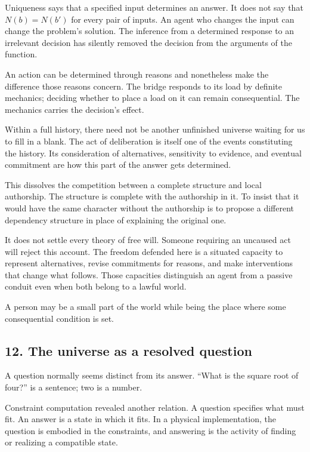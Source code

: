 \documentclass[
  11pt,
]{article}
\begin{document}
Uniqueness says that a specified input determines an answer. It does not
say that \(N(b)=N(b')\) for every pair of inputs. An agent who changes
the input can change the problem's solution. The inference from a
determined response to an irrelevant decision has silently removed the
decision from the arguments of the function.

An action can be determined through reasons and nonetheless make the
difference those reasons concern. The bridge responds to its load by
definite mechanics; deciding whether to place a load on it can remain
consequential. The mechanics carries the decision's effect.

Within a full history, there need not be another unfinished universe
waiting for us to fill in a blank. The act of deliberation is itself one
of the events constituting the history. Its consideration of
alternatives, sensitivity to evidence, and eventual commitment are how
this part of the answer gets determined.

This dissolves the competition between a complete structure and local
authorship. The structure is complete with the authorship in it. To
insist that it would have the same character without the authorship is
to propose a different dependency structure in place of explaining the
original one.

It does not settle every theory of free will. Someone requiring an
uncaused act will reject this account. The freedom defended here is a
situated capacity to represent alternatives, revise commitments for
reasons, and make interventions that change what follows. Those
capacities distinguish an agent from a passive conduit even when both
belong to a lawful world.

A person may be a small part of the world while being the place where
some consequential condition is set.

\subsection{12. The universe as a resolved
question}\label{the-universe-as-a-resolved-question}

A question normally seems distinct from its answer. ``What is the square
root of four?'' is a sentence; two is a number.

Constraint computation revealed another relation. A question specifies
what must fit. An answer is a state in which it fits. In a physical
implementation, the question is embodied in the constraints, and
answering is the activity of finding or realizing a compatible state.
\end{document}
